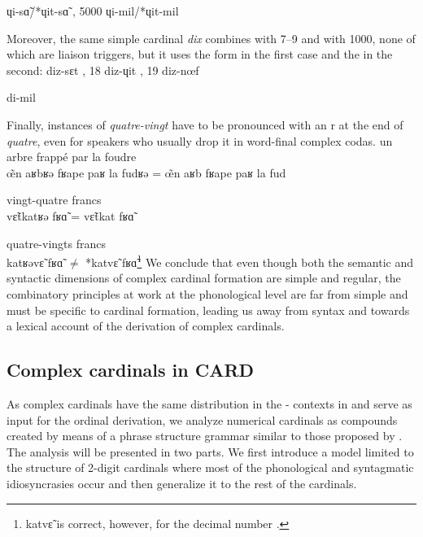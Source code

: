 \documentclass[output=paper]{langsci/langscibook}
\begin{document}
	 ɥi-sɑ̃/*ɥit-sɑ̃ %
, 5000 ɥi-mil/*ɥit-mil %

	\z
\z
\medskip

Moreover, the same simple cardinal \emph{dix}  combines with 7--9 and with 1000, none of which are liaison  triggers, but it uses the \lplus{} form in the first case  and the  \lmoins{} in the second:
 \ea
	 diz-sɛt %
, 18 diz-ɥit %
, 19 diz-nœf %

	 di-mil %

	\z
\z
\medskip

Finally, instances of \emph{quatre-vingt} have to be pronounced with an r %
 at the end of \emph{quatre}, even for speakers who usually drop it in word-final complex codas.
\ea
	\ea un arbre frappé par la foudre\\œ̃n aʁbʁə fʁape paʁ la fudʁə %
 = œ̃n aʁb fʁape paʁ la fud %

	\ex vingt-quatre francs \\ vɛ̃tkatʁə fʁɑ̃ %
 = vɛ̃tkat fʁɑ̃ %

	\ex quatre-vingts francs \\ katʁəvɛ̃ fʁɑ̃ %
 $\neq$ *katvɛ̃ fʁɑ̃\footnote{katvɛ̃ %
 is correct, however, for the decimal number .}
	\z
\z
We conclude that even though both the semantic and syntactic dimensions of complex cardinal formation are simple and regular, the combinatory principles at work at the phonological level are far from simple and must be specific to cardinal formation, leading us away from syntax and towards a lexical account of the derivation of complex cardinals.




\subsection{\textbf{Complex cardinals in CARD}}

As complex cardinals  have the same distribution in the \citeauthor{Saulnier10}-\citeauthor{Leeman04} contexts in  and serve as input for the ordinal derivation,
we analyze numerical cardinals  as compounds  created by means of a phrase structure grammar similar to those proposed by \cite{Hurford75,Hurford94,Hurford98,Hurford07}. The analysis will be presented in two parts. We first introduce a model limited to the structure of 2-digit cardinals  where most of the phonological and syntagmatic idiosyncrasies occur and then generalize it to the rest of the cardinals.
\end{document}
